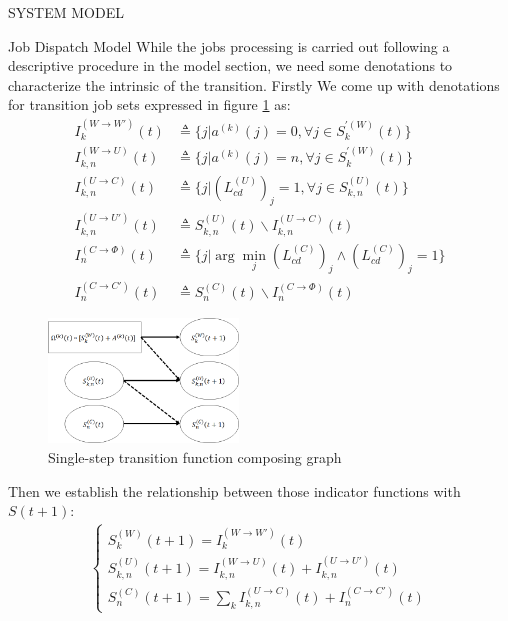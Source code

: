 \documentclass[10pt, conference, letterpaper]{IEEEtran}
\begin{document}
\begin{section}{SYSTEM MODEL}
\begin{subsection}{Job Dispatch Model}
            While the jobs processing is carried out following a descriptive procedure in the model section, we need some denotations to characterize the intrinsic of the transition. Firstly We come up with denotations for transition job sets expressed in figure \ref{fig:trans} as:
            \begin{align}
                I^{(W \to W')}_{k}(t) & \triangleq \{ j | a^{(k)}(j)=0, \forall j \in S^{'(W)}_k(t)\}
                \\
                I^{(W \to U)}_{k,n}(t) &\triangleq \{ j | a^{(k)}(j)=n, \forall j \in S^{'(W)}_k(t)\}
                \\
                I^{(U \to C)}_{k,n}(t) &\triangleq \{j|(L^{(U)}_{cd})_j=1, \forall j \in S^{(U)}_{k,n}(t)\}
                \\
                I^{(U \to U')}_{k,n}(t) &\triangleq S^{(U)}_{k,n}(t) \backslash I^{(U \to C)}_{k,n}(t)
                \\
                I^{(C \to \Phi)}_{n}(t) &\triangleq \{j|\arg\min_{j} (L^{(C)}_{cd})_j \wedge (L^{(C)}_{cd})_j=1\}
                \\
                I^{(C \to C')}_{n}(t) &\triangleq S^{(C)}_{n}(t) \backslash I^{(C \to \Phi)}_{n}(t)
            \end{align}
            \begin{figure}[h]
                \centering
                \includegraphics[width=0.45\textwidth]{single-transition.png}
                \caption{Single-step transition function composing graph}
                \label{fig:trans}
            \end{figure}
            Then we establish the relationship between those indicator functions with $S(t+1)$:
            \begin{align}
                \begin{cases}
                    S^{(W)}_{k}(t+1) = I^{(W \to W')}_{k}(t)
                    \\
                    S^{(U)}_{k,n}(t+1) = I^{(W \to U)}_{k,n}(t) + I^{(U \to U')}_{k,n}(t)
                    \\
                    S^{(C)}_{n}(t+1) = \sum_k I^{(U \to C)}_{k,n}(t) + I^{(C \to C')}_{n}(t)
                \end{cases}
            \end{align}
        \end{subsection}
    \end{section}
\end{document}
